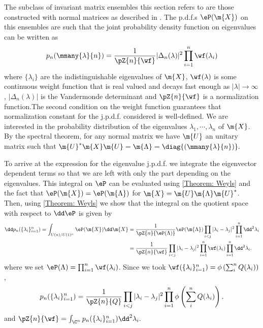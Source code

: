 The subclass of invariant matrix ensembles this section refers to are those constructed with normal matrices as described in  . The p.d.f.s $\eP(\m{X})$ on this ensembles are such that the joint probability density function on eigenvalues can be written as
\begin{equation}  	\label{Equation: invariance pseudodefinition}
	p_n(\mmany{\lambda}{n}) = \frac{1}{\pZ{n}{\wf}} |\Delta_n(\lambda)|^2  \prod_{i=1}^{n} \wf(\lambda_i)
\end{equation}
where $\{\lambda_i\}$ are the indistinguishable eigenvalues of $\m{X}$, $\wf(\lambda)$ is some continuous weight function that is real valued and decays fast enough as $|\lambda| \rightarrow \infty$, $ |\Delta_n(\lambda)|$ is the Vandermonde determinant and $\pZ{n}{\wf}$ is a normalization function.The second condition on the weight function guarantees that normalization constant for the j.p.d.f. considered is well-defined. We are interested in the probability distribution of the eigenvalues $\lambda_1, \cdots, \lambda_n$ of $\m{X}$.  By the spectral theorem, for any normal matrix we have $\m{U}$ an unitary matrix such that $ \m{U}^{*} \m{X} \m{U} = \m{\Lambda} = \diag{(\mmany{\lambda}{n})}.$

To arrive at the expression for the eigenvalue j.p.d.f. we integrate the eigenvector dependent terms so that we are left with only the part depending on the eigenvalues. This integral on $\eP$ can be evaluated using \autoref{Theorem: Weyls} and the fact that $\eP(\m{X}) = \eP(\m{\Lambda})$ for $\m{X} = \m{U} \m{\Lambda} \m{U}^*$. Then, using \autoref{Theorem: Weyls} we show that the integral on the quotient space with respect to $\dd \eP$ is given by
\begin{align}
	\dd p_n(\{\lambda_i\}_{i=1}^n) = \int_{U(n)/U(1)^n}  \eP(\m{X}) \dd \m{X} 
	& =  \frac{1}{\pZ{n}{\eP(\Lambda)}} \eP(\m{\Lambda})  \prod_{i < j} |\lambda_i - \lambda_j|^2 \prod_{i=1}^{n} \dd^2 \lambda_i\\
	& = \frac{1}{\pZ{n}{\wf}} \prod_{i < j} |\lambda_i - \lambda_j|^2   \prod_{i=1}^{n} \wf(\lambda_i) \prod_{i=1}^{n} \dd^2 \lambda_i.
\end{align}
where we set $\eP(\Lambda) = \prod_{i=1}^{n} \wf(\lambda_i)$. Since we took $\wf(\{\lambda_i\}_{i=1}^n) = \phi\left(\sum_i^n {Q(\lambda_i)} \right)$,
\begin{equation}
	p_n(\{\lambda_i\}_{i=1}^n) = \frac{1}{\pZ{n}{Q}} \prod_{i < j} |\lambda_i - \lambda_j|^2   \prod_{i=1}^{n} \phi\left(\sum_i^n {Q(\lambda_i)} \right).
\end{equation}
 and
$
	\pZ{n}{\wf} = \int_{\C^n} p_n(\{\lambda_i\}_{i=1}^n)   \dd^2 \lambda_i.
$

